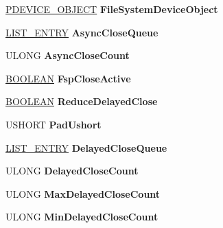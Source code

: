 \begin{DoxyCompactItemize}
\hyperlink{struct___d_e_v_i_c_e___o_b_j_e_c_t}{P\+D\+E\+V\+I\+C\+E\+\_\+\+O\+B\+J\+E\+CT} {\bfseries File\+System\+Device\+Object}
\item 
\mbox{\label{struct___c_d___d_a_t_a_a57b49866a6d00429beb59094d04cb369}} 
\hyperlink{struct___l_i_s_t___e_n_t_r_y}{L\+I\+S\+T\+\_\+\+E\+N\+T\+RY} {\bfseries Async\+Close\+Queue}
\item 
\mbox{\label{struct___c_d___d_a_t_a_ad03ee6d22a375b00a3e4c8e9fd9b2fe4}} 
U\+L\+O\+NG {\bfseries Async\+Close\+Count}
\item 
\mbox{\label{struct___c_d___d_a_t_a_aa8760e3b08af774d5ca0dfecca81e31a}} 
\hyperlink{_processor_bind_8h_a112e3146cb38b6ee95e64d85842e380a}{B\+O\+O\+L\+E\+AN} {\bfseries Fsp\+Close\+Active}
\item 
\mbox{\label{struct___c_d___d_a_t_a_a306f1dbbd079fcc9a31e74d8c58a73a4}} 
\hyperlink{_processor_bind_8h_a112e3146cb38b6ee95e64d85842e380a}{B\+O\+O\+L\+E\+AN} {\bfseries Reduce\+Delayed\+Close}
\item 
\mbox{\label{struct___c_d___d_a_t_a_acca3c871143861f0b7841fe2858329ec}} 
U\+S\+H\+O\+RT {\bfseries Pad\+Ushort}
\item 
\mbox{\label{struct___c_d___d_a_t_a_ac6256a8848b78e371a4e7409dcb790d3}} 
\hyperlink{struct___l_i_s_t___e_n_t_r_y}{L\+I\+S\+T\+\_\+\+E\+N\+T\+RY} {\bfseries Delayed\+Close\+Queue}
\item 
\mbox{\label{struct___c_d___d_a_t_a_a4a2e49dead5fbdf24d8896cdb2f4013a}} 
U\+L\+O\+NG {\bfseries Delayed\+Close\+Count}
\item 
\mbox{\label{struct___c_d___d_a_t_a_a7a68b52a2d9cb9367907600680a233b3}} 
U\+L\+O\+NG {\bfseries Max\+Delayed\+Close\+Count}
\item 
\mbox{\label{struct___c_d___d_a_t_a_a1f38a1bf78ea345088a5966b51b4f205}} 
U\+L\+O\+NG {\bfseries Min\+Delayed\+Close\+Count}
\item 
\mbox{\label{struct___c_d___d_a_t_a_a1cd4cad063b57e6c7044793debf55230}} 

\end{DoxyCompactItemize}
